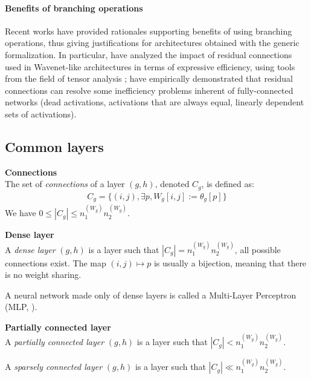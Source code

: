 \paragraph{Benefits of branching operations}
Recent works have provided rationales supporting benefits of using branching operations, thus giving justifications for architectures obtained with the generic formalization. In particular, \citep{cohen2018boosting} have analyzed the impact of residual connections used in Wavenet-like architectures \citep{van2016wavenet} in terms of expressive efficiency, using tools from the field of tensor analysis ; \citep{orhan2018skip} have empirically demonstrated that residual connections can resolve some inefficiency problems inherent of fully-connected networks (dead activations, activations that are always equal, linearly dependent sets of activations).


\subsection{Common layers}
\label{sec:layer}

\begin{definition}\textbf{Connections}\\
The set of \emph{connections} of a layer $(g,h)$, denoted $C_g$, is defined as:
\begin{gather*}
  C_g = \{(i,j), \exists p, W_g[i,j] := \theta_g[p]\}
\end{gather*}
We have $0 \leq |C_g| \leq n_1^{(W_g)} n_2^{(W_g)}$.
\end{definition}

\begin{definition}\textbf{Dense layer}\\
A \emph{dense layer} $(g,h)$ is a layer such that $|C_g| = n_1^{(W_g)} n_2^{(W_g)}$, \ie all possible connections exist. The map $(i,j) \mapsto p$ is usually a bijection, meaning that there is no weight sharing.
\end{definition}

A neural network made only of dense layers is called a Multi-Layer Perceptron (MLP, \cite{hornik1989multilayer}).

\begin{definition}\textbf{Partially connected layer}\\{}
A \emph{partially connected layer} $(g,h)$ is a layer such that $|C_g| < n_1^{(W_g)} n_2^{(W_g)}$.

A \emph{sparsely connected layer} $(g,h)$ is a layer such that $|C_g| \ll n_1^{(W_g)} n_2^{(W_g)}$.
\end{definition}

